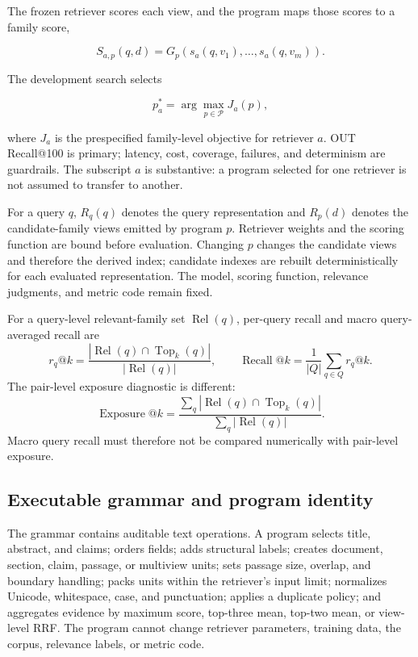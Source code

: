\documentclass[final,5p,times,twocolumn]{elsarticle}
\begin{document}
The frozen retriever scores each view, and the program maps those scores to a
family score,

\begin{equation}
 S_{a,p}(q,d)=G_p\!\left(s_a(q,v_1),\ldots,s_a(q,v_m)\right).
\end{equation}

The development search selects

\begin{equation}
 p_a^{*}=\arg\max_{p\in\mathcal{P}}J_a(p),
\end{equation}

where \(J_a\) is the prespecified family-level objective for retriever \(a\). OUT
Recall@100 is primary; latency, cost, coverage, failures, and determinism are
guardrails. The subscript \(a\) is substantive: a program selected for one
retriever is not assumed to transfer to another.

For a query \(q\), \(R_q(q)\) denotes the query representation and \(R_p(d)\)
denotes the candidate-family views emitted by program \(p\). Retriever weights
and the scoring function are bound before evaluation. Changing \(p\) changes
the candidate views and therefore the derived index; candidate indexes are
rebuilt deterministically for each evaluated representation. The model,
scoring function, relevance judgments, and metric code remain fixed.

For a query-level relevant-family set \(\operatorname{Rel}(q)\), per-query
recall and macro query-averaged recall are
\begin{equation}
 r_q@k=\frac{|\operatorname{Rel}(q)\cap\operatorname{Top}_k(q)|}
 {|\operatorname{Rel}(q)|},\qquad
 \operatorname{Recall}@k=\frac{1}{|Q|}\sum_{q\in Q}r_q@k .
\end{equation}
The pair-level exposure diagnostic is different:
\begin{equation}
 \operatorname{Exposure}@k=\frac{\sum_q|\operatorname{Rel}(q)\cap
 \operatorname{Top}_k(q)|}{\sum_q|\operatorname{Rel}(q)|}.
\end{equation}
Macro query recall must therefore not be compared numerically with pair-level
exposure.

\subsection{Executable grammar and program identity}

The grammar contains auditable text operations. A program selects title,
abstract, and claims; orders fields; adds structural labels; creates document,
section, claim, passage, or multiview units; sets passage size, overlap, and
boundary handling; packs units within the retriever's input limit; normalizes
Unicode, whitespace, case, and punctuation; applies a duplicate policy; and
aggregates evidence by maximum score, top-three mean, top-two mean, or
view-level RRF. The program cannot change retriever parameters, training data,
the corpus, relevance labels, or metric code.
\end{document}
